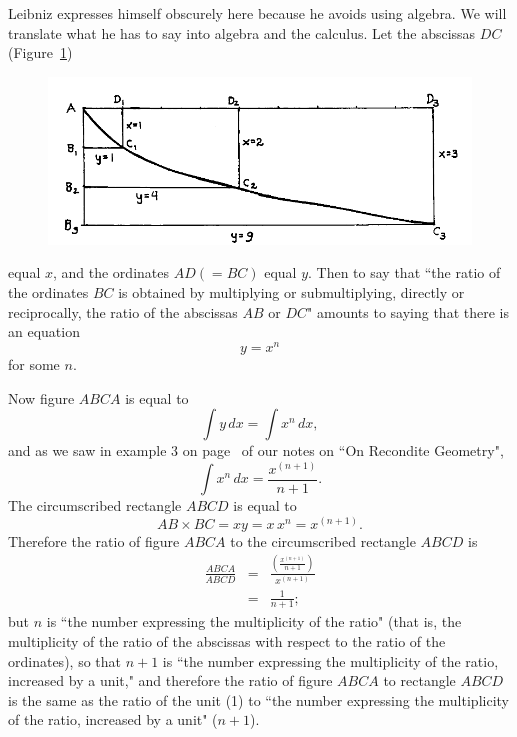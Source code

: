 \documentclass[twoside,openright]{article}
\newlength{\oldjot}
\begin{document}
Leibniz expresses himself obscurely here because he avoids using
algebra.  We will translate what he has to say into algebra and the
calculus.  Let the abscissas $DC$ (Figure~\ref{parquad})
\begin{figure}[htp]
  \begin{center}
    \includegraphics[width=\textwidth]{fig/Figure57}
    \caption{}
    \label{parquad}
    \vspace{-10pt}
  \end{center}
\end{figure}
equal $x$, and the ordinates $AD (= BC)$ equal $y$.  Then to say that
``the ratio of the ordinates $BC$ is obtained by multiplying or
submultiplying, directly or reciprocally, the ratio of the abscissas
$AB$ or $DC$" amounts to saying that there is an equation
$$y = x^n$$
for some $n$.  

Now figure $ABCA$ is equal to 
$$\int\! y\,dx = \int\! x^n\,dx,$$
and as we saw in example 3 on page~\pageref{intxn} of our notes on
``On Recondite Geometry",
$$\int\! x^n\,dx = \frac{x^{(n+1)}}{n+1}.$$
The circumscribed rectangle $ABCD$ is equal to 
$$AB \times BC = xy = x\,x^n = x^{(n+1)}.$$
Therefore the ratio of figure $ABCA$ to the circumscribed rectangle
$ABCD$ is
\setlength{\jot}{2ex}
\begin{eqnarray*}
  \frac{ABCA}{ABCD} & = & \frac{\left(\frac{x^{(n+1)}}{n+1}\right)}{x^{(n+1)}}\\
                    & = & \frac{1}{n+1};
\end{eqnarray*}
\setlength{\jot}{\oldjot}
\hspace{-.33em}but $n$ is ``the number expressing the multiplicity of
the ratio" (that is, the multiplicity of the ratio of the abscissas
with respect to the ratio of the ordinates), so that $n+1$ is ``the
number expressing the multiplicity of the ratio, increased by a unit,"
and therefore the ratio of figure $ABCA$ to rectangle $ABCD$ is the
same as the ratio of the unit (1) to ``the number expressing the
multiplicity of the ratio, increased by a unit" ($n+1$).
\end{document}
